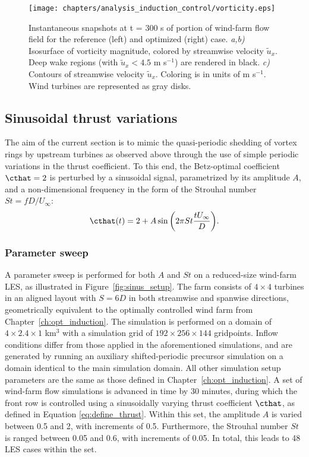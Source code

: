 \begin{figure}
	\centering
	\texttt{[image: chapters/analysis\_induction\_control/vorticity.eps]}
	\caption{Instantaneous snapshots at t = 300 s of portion of wind-farm flow field for the reference (left) and optimized (right) case. \emph{a,b) } Isosurface of vorticity magnitude, colored by streamwise velocity $\widetilde{u}_x$. Deep wake regions (with $\widetilde{u}_x < 4.5$ m s$^{-1}$) are rendered in black. \emph{c)} Contours of streamwise velocity $\widetilde{u}_x$. Coloring is in units of m s$^{-1}$. Wind turbines are represented as gray disks. \label{fig:vorticity_windfarm}}
\end{figure}


\subsection{Sinusoidal thrust variations}\label{sec:opt_sinus}
The aim of the current section is to mimic the quasi-periodic shedding of vortex rings by upstream turbines as observed above through the use of simple periodic variations in the thrust coefficient. To this end, the Betz-optimal coefficient $\cthat = 2$ is perturbed by a sinusoidal signal, parametrized by its amplitude $A$, and a non-dimensional frequency in the form of the Strouhal number $St = f D/ U_\infty$:
\begin{equation}
	\cthat(t) = 2 + A \sin \bigg(2\pi St \frac{t U_\infty}{D} \bigg).\label{eq:define_thrust}
\end{equation}

\subsubsection{Parameter sweep}
A parameter sweep is performed for both $A$ and $St$ on a reduced-size wind-farm LES, as illustrated in Figure~\ref{fig:sinus_setup}. The farm consists of $4 \times 4$ turbines in an aligned layout with $S = 6D$ in both streamwise and spanwise directions, geometrically equivalent to the optimally controlled wind farm from Chapter~\ref{ch:opt_induction}. The simulation is performed on a domain of $4 \times 2.4 \times 1$ km$^3$ with a simulation grid of $192 \times 256 \times 144$ gridpoints. Inflow conditions differ from those applied in the aforementioned simulations, and are generated by running an auxiliary shifted-periodic precursor simulation on a domain identical to the main simulation domain. All other simulation setup parameters are the same as those defined in Chapter~\ref{ch:opt_induction}. A set of wind-farm flow simulations is advanced in time by 30 minutes, during which the front row is controlled using a sinusoidally varying thrust coefficient $\cthat$, as defined in Equation \eqref{eq:define_thrust}. Within this set, the amplitude $A$ is varied between 0.5 and 2, with increments of 0.5. Furthermore, the Strouhal number $St$ is ranged between 0.05 and 0.6, with increments of 0.05. In total, this leads to 48 LES cases within the set. 

